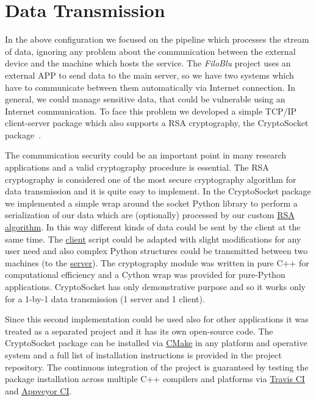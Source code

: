 \documentclass{standalone}
\begin{document}
\section*{Data Transmission}

In the above configuration we focused on the pipeline which processes the stream of data, ignoring any problem about the communication between the external device and the machine which hosts the service.
The \emph{FiloBlu} project uses an external APP to send data to the main server, so we have two systems which have to communicate between them automatically via Internet connection.
In general, we could manage sensitive data, that could be vulnerable using an Internet communication.
To face this problem we developed a simple TCP/IP client-server package which also supports a RSA cryptography, the \textsf{CryptoSocket} package~\cite{CryptoSocket}.

The communication security could be an important point in many research applications and a valid cryptography procedure is essential.
The RSA cryptography is considered one of the most secure cryptography algorithm for data transmission and it is quite easy to implement.
In the \textsf{CryptoSocket} package we implemented a simple wrap around the \textsf{socket} \textsf{Python} library to perform a serialization of our data which are (optionally) processed by our custom \href{https://en.wikipedia.org/wiki/RSA_(cryptosystem)}{RSA algorithm}.
In this way different kinds of data could be sent by the client at the same time.
The \href{https://github.com/Nico-Curti/CryptoSocket/blob/master/CryptoSocket/examples/client.py}{client} script could be adapted with slight modifications for any user need and also complex \textsf{Python} structures could be transmitted between two machines (to the \href{https://github.com/Nico-Curti/CryptoSocket/blob/master/CryptoSocket/examples/server.py}{server}).
The cryptography module was written in pure \textsf{C++} for computational efficiency and a \textsf{Cython} wrap was provided for pure-\textsf{Python} applications.
\textsf{CryptoSocket} has only demonstrative purpose and so it works only for a 1-by-1 data transmission (1 server and 1 client).

Since this second implementation could be used also for other applications it was treated as a separated project and it has its own open-source code.
The \textsf{CryptoSocket} package can be installed via \href{https://github.com/Nico-Curti/CryptoSocket/blob/master/CMakeLists.txt}{\textsf{CMake}} in any platform and operative system and a full list of installation instructions is provided in the project repository.
The continuous integration of the project is guaranteed by testing the package installation across multiple \textsf{C++} compilers and platforms via \href{https://github.com/Nico-Curti/CryptoSocket/blob/master/.travis.yml}{Travis CI} and \href{https://github.com/Nico-Curti/CryptoSocket/blob/master/appveyor.yml}{Appveyor CI}.
\end{document}
